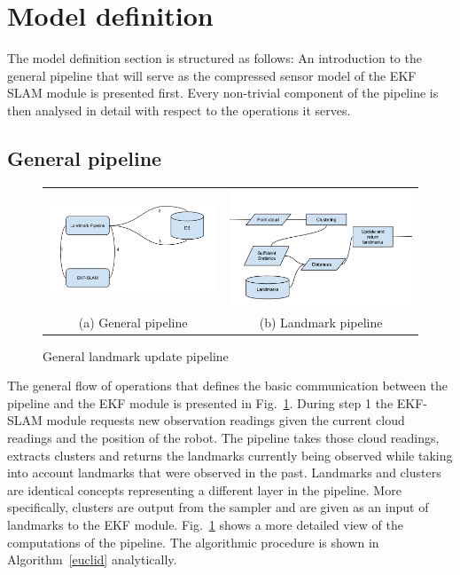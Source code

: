 \documentclass[twoside,hidelinks]{article}
\begin{document}
\newpage
\section{Model definition}
\label{sec:model}

The model definition section is structured as follows: An introduction to the general pipeline that will serve as the compressed sensor model of the EKF SLAM module is presented first. Every non-trivial component of the pipeline is then analysed in detail with respect to the operations it serves.

\subsection{General pipeline}

\begin{figure}
\begin{tabular}{cc}
  \includegraphics[width=.33\textwidth]{workflowGen} &    \includegraphics[width=.33\textwidth]{workflowSpec} \\
(a) General pipeline & (b) Landmark pipeline \\[6pt]
\end{tabular}
\caption{General landmark update pipeline}
\label{pipeline}
\end{figure}


The general flow of operations that defines the basic communication between the pipeline and the EKF module is presented in Fig.~\ref{pipeline}. During step 1 the EKF-SLAM module requests new observation readings given the current cloud readings and the position of the robot. The pipeline takes those cloud readings, extracts clusters and returns the landmarks currently being observed while taking into account landmarks that were observed in the past. Landmarks and clusters are identical concepts representing a different layer in the pipeline. More specifically, clusters are output from the sampler and are given as an input of landmarks to the EKF module. Fig.~\ref{pipeline} shows a more detailed view of the computations of the pipeline. The algorithmic procedure is shown in Algorithm~\ref{euclid} analytically.
\end{document}
